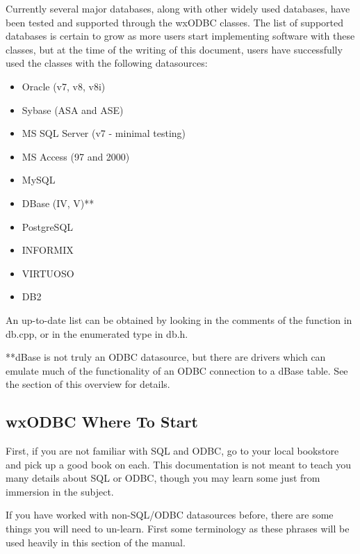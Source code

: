 Currently several major databases, along with other widely used databases, 
have been tested and supported through the wxODBC classes.  The list of 
supported databases is certain to grow as more users start implementing 
software with these classes, but at the time of the writing of this document, 
users have successfully used the classes with the following datasources:

\begin{itemize}\itemsep=0pt
\item Oracle (v7, v8, v8i)
\item Sybase (ASA and ASE)
\item MS SQL Server (v7 - minimal testing)
\item MS Access (97 and 2000)
\item MySQL
\item DBase (IV, V)**
\item PostgreSQL
\item INFORMIX
\item VIRTUOSO
\item DB2
\end{itemize}

An up-to-date list can be obtained by looking in the comments of the function 
 in db.cpp, or in the enumerated type 
 in db.h.

**dBase is not truly an ODBC datasource, but there are drivers which can 
emulate much of the functionality of an ODBC connection to a dBase table.  
See the  section of this 
overview for details.


\subsection{wxODBC Where To Start}\label{wxodbcwheretostart}

First, if you are not familiar with SQL and ODBC, go to your local bookstore 
and pick up a good book on each.  This documentation is not meant to teach 
you many details about SQL or ODBC, though you may learn some just from 
immersion in the subject.

If you have worked with non-SQL/ODBC datasources before, there are some 
things you will need to un-learn.  First some terminology as these phrases will 
be used heavily in this section of the manual.

